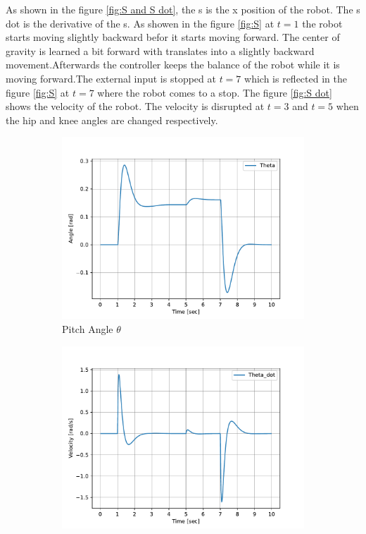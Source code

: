 As shown in the figure \ref{fig:S and S dot}, the s is the x position of the robot. The s dot is the derivative of the s. As showen in the figure \ref{fig:S} at $t=1$ the robot starts moving slightly backward befor it starts moving forward. The center of gravity is learned a bit forward with translates into a slightly backward movement.Afterwards the controller keeps the balance of the robot while it is moving forward.The external input is stopped at $t=7$ which is reflected in the figure \ref{fig:S} at $t=7$ where the robot comes to a stop. The figure \ref{fig:S dot} shows the velocity of the robot. The velocity is disrupted at $t=3$ and $t=5$ when the hip and knee angles are changed respectively.
\vspace{3cm}
\begin{figure}[h]
	\centering
	\begin{subfigure}[t]{0.45\textwidth}
		\includegraphics[width=\textwidth]{Theta}
		\caption{Pitch Angle $\theta$}
		\label{fig:Theta}
	\end{subfigure}
	\begin{subfigure}[t]{0.45\textwidth}
		\includegraphics[width=\textwidth]{Theta_dot}

\end{subfigure}
\end{figure}
